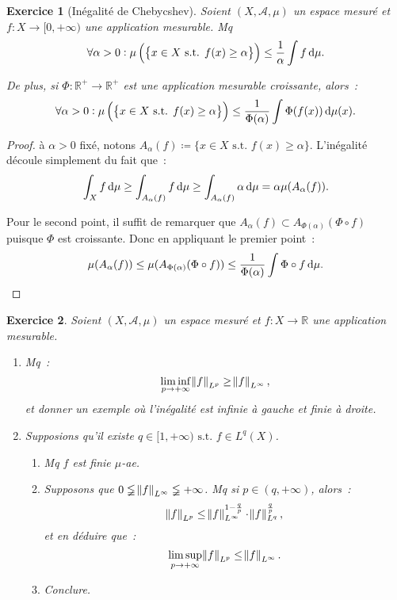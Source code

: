 \documentclass{article}
\newtheorem{ex}{Exercice}[section]
\theoremstyle{definition}
\newcommand{\pinfty}{{+\infty}}
\newcommand{\st}{\text{ s.t. }}
\newcommand{\R}{{\mathbb R}}
\begin{document}
\begin{ex}[Inégalité de Chebycshev] Soient $(X, \mathcal A, \mu)$ un espace mesuré et $f : X \to [0, \pinfty)$ une application mesurable. Mq
\[\forall \alpha > 0 : \mu\left(\left\{x \in X \st f(x) \geq \alpha\right\}\right) \leq \frac 1\alpha\int f\dif\mu.\]

De plus, si $\Phi : \R^+ \to \R^+$ est une application mesurable croissante, alors~:
\[\forall \alpha > 0 : \mu\left(\left\{x \in X \st f(x) \geq \alpha\right\}\right) \leq \frac 1{\Phi(\alpha)}\int \Phi(f(x))\dif\mu(x).\]
\end{ex}

\begin{proof} à $\alpha > 0$ fixé, notons $A_\alpha(f) \coloneqq \{x \in X \st f(x) \geq \alpha\}$. L'inégalité découle simplement du fait que~:
\[\int_Xf\dif\mu \geq \int_{A_\alpha(f)}f\dif\mu \geq \int_{A_\alpha(f)}\alpha\dif\mu = \alpha\mu(A_\alpha(f)).\]

Pour le second point, il suffit de remarquer que $A_\alpha(f) \subset A_{\Phi(\alpha)}(\Phi \circ f)$ puisque $\Phi$ est croissante. Donc en appliquant le premier point~:
\[\mu(A_\alpha(f)) \leq \mu(A_{\Phi(\alpha)}(\Phi \circ f)) \leq \frac 1{\Phi(\alpha)}\int\Phi\circ f\dif\mu.\]
\end{proof}

\begin{ex} Soient $(X, \mathcal A, \mu)$ un espace mesuré et $f : X \to \R$ une application mesurable.
\begin{enumerate}
	\item Mq~:
	\[\liminf_{p \to \pinfty}\norm f_{L^p} \geq \norm f_{L^\infty},\]
	et donner un exemple où l'inégalité est infinie à gauche et finie à droite.
	\item Supposions qu'il existe $q \in [1, \pinfty) \st f \in L^q(X)$.
	\begin{enumerate}
		\item Mq $f$ est finie $\mu$-ae.
		\item Supposons que $0 \lneqq \norm f_{L^\infty} \lneqq \pinfty$. Mq si $p \in (q, \pinfty)$, alors~:
		\[\norm f_{L^p} \leq \norm f_{L^\infty}^{1-\frac qp} \cdot \norm f_{L^q}^{\frac qp},\]
		et en déduire que~:
		\[\limsup_{p \to \pinfty} \norm f_{L^p} \leq \norm f_{L^\infty}.\]
		\item Conclure.
	\end{enumerate}
\end{enumerate}
\end{ex}
\end{document}
